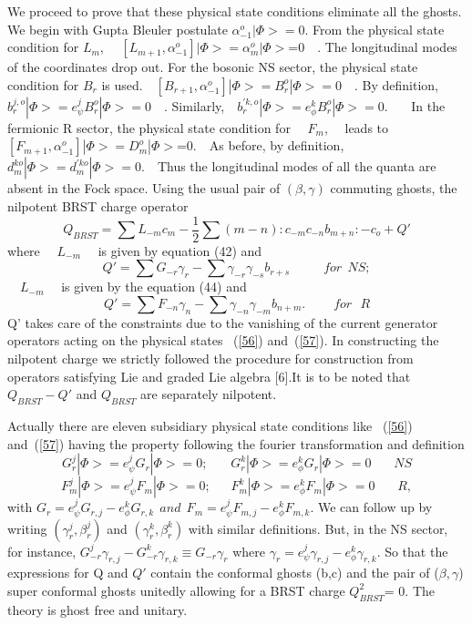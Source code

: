 \documentclass[a4paper,showpacs,preprintnumbers,amsmath,amssymb]{revtex4}
\begin{document}
We proceed to prove that these physical state conditions eliminate all the ghosts. We
begin with Gupta Bleuler postulate  $\alpha^o_{-1}|\Phi>=0$. From the physical state
condition for $L_m$, ~~$[L_{m+1}, \alpha^o_{-1}]|\Phi>=\alpha^o_m|\Phi>$=0~~. 
The longitudinal modes of the coordinates drop out. For the bosonic NS sector,
the physical state condition for $B_r$ is used.~~$[ B_{r+1}, \alpha^o_{-1}]|\Phi>=
B_r^o|\Phi>=0$~~. By definition, ~~$b_{r}^{j,o}|\Phi>=e_{\psi}^jB_r^o|\Phi>=0$~~.
Similarly,~~$b_{r}^{'k,o}|\Phi>=e_{\phi}^k B_r^o|\Phi>=0$.~~~ In the fermionic R sector, the physical state condition for ~~$F_m$,~~ leads to
~~$[F_{m+1}, \alpha^o_{-1}]|\Phi>=D^o_m|\Phi>$=0.~~As before, by definition, 
~~~$d_m^{ko}|\Phi> = d_m^{'ko}|\Phi> = 0$.~~Thus the longitudinal modes of all the 
quanta are absent in the Fock space. Using the usual pair of $(\beta,\gamma)$ 
commuting ghosts, the nilpotent BRST charge operator
\begin{equation}
Q_{BRST}=\sum L_{-m}c_m -\frac{1}{2}\sum (m-n):c_{-m}c_{-n}b_{m+n}: - c_o + Q'
\end{equation}
where ~~$L_{-m}$~~ is given by equation (42) and
\begin{equation}
 Q'=\sum G_{-r}\gamma_r -\sum\gamma_{-r}\gamma_{-s}b_{r+s}~~~~~~~~~~~~for~~  NS;
\end{equation}
~~$L_{-m}$~~ is given by the equation (44) and
\begin{equation}
 Q'=\sum F_{-n}\gamma_{n} -\sum\gamma_{-n}\gamma_{-m}b_{n+m}.~~~~~~~~~~ for~~~ R
\end{equation}
Q' takes care of the constraints due to the vanishing of the current generator operators
acting on the physical states ~(\ref{56}) and~(\ref{57}). In constructing the nilpotent
charge we strictly followed the procedure for construction from operators satisfying
Lie and graded Lie algebra [6].It is to be noted that $Q_{BRST} - Q'$ and $Q_{BRST}$ are 
separately nilpotent. 

Actually there are eleven subsidiary physical state conditions 
like  ~(\ref{56}) and~(\ref{57}) having the 
property following the fourier transformation and definition
\begin{equation}
G_r^j|\Phi> = e_{\psi}^j G_r |\Phi> = 0; ~~~~~~~~G_r^k|\Phi> = e_{\phi}^k G_r |\Phi> = 0 ~~~~~~~~NS
\end{equation}
\begin{equation}
F_m^j|\Phi> = e_{\psi}^j F_m |\Phi> = 0; ~~~~~~~ F_m^k|\Phi> = e_{\phi}^k F_m |\Phi> = 0 ~~~~~~~~R,
\end{equation} 
with $ G_r =  e_{\psi}^j G_{r,j} -  e_{\phi}^k G_{r,k}~~ and~~  
F_m =  e_{\psi}^j F_{m,j} -  e_{\phi}^k F_{m,k}$. We can follow up by writing $(\gamma^j_r,
\beta^j_r)$ and  $(\gamma^k_r, \beta^k_r)$ with similar definitions. But, in the NS sector,
 for instance, $ G^j_{-r}\gamma_{r,j} - G^k_{-r}\gamma_{r,k}\equiv G_{-r}\gamma_r$ where
$\gamma_r = e^j_{\psi}\gamma_{r,j} -  e^k_{\phi}\gamma_{r,k}$. So that the expressions for Q
and $Q'$  contain the conformal ghosts (b,c) and the pair of ($\beta ,\gamma$) super
conformal ghosts unitedly allowing for a BRST charge $ Q^2_{BRST}$= 0. The theory is ghost
free and unitary.
\end{document}
